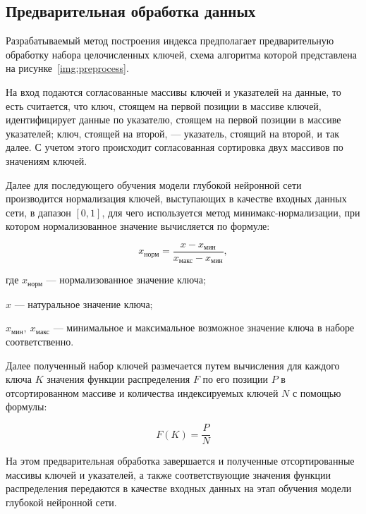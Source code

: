 \subsection{Предварительная обработка данных}

Разрабатываемый метод построения индекса предполагает предварительную обработку
набора целочисленных ключей, схема алгоритма которой представлена на
рисунке~\ref{img:preprocess}.


На вход подаются согласованные массивы ключей и указателей на данные, то есть
считается, что ключ, стоящем на первой позиции в массиве ключей, идентифицирует
данные по указателю, стоящем на первой позиции в массиве указателей; ключ,
стоящей на второй, --- указатель, стоящий на второй, и так далее. С учетом этого
происходит согласованная сортировка двух массивов по значениям ключей.

Далее для последующего обучения модели глубокой нейронной сети производится
нормализация ключей, выступающих в качестве входных данных сети, в дапазон $[0,
1]$, для чего используется метод минимакс-нормализации, при котором
нормализованное значение вычисляется по формуле:

\begin{equation}
    x_{\text{норм}}= \frac{x - x_{\text{мин}}}{x_{\text{макс}} - x_{\text{мин}}},
\end{equation}

где $x_{\text{норм}}$ --- нормализованное значение ключа;

$x$ --- натуральное значение ключа;

$x_{\text{мин}},~x_{\text{макс}}$ --- минимальное и максимальное возможное
значение ключа в наборе соответственно.

Далее полученный набор ключей размечается путем вычисления для каждого ключа $K$
значения функции распределения $F$ по его позиции $P$ в отсортированном массиве
и количества индексируемых ключей $N$ с помощью формулы:

\begin{equation}
    F(K) = \frac{P}{N}
\end{equation}

На этом предварительная обработка завершается и полученные отсортированные
массивы ключей и указателей, а также соответствующие значения функции
распределения передаются в качестве входных данных на этап обучения модели
глубокой нейронной сети.

